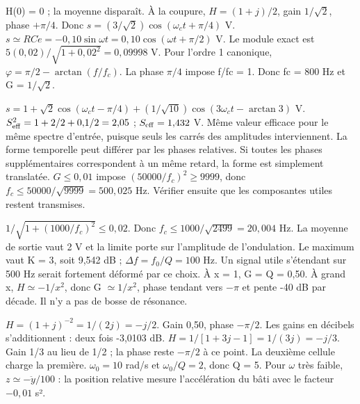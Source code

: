 H(0) = 0 ; la moyenne disparaît. À la coupure, $H=(1+j)/2$, gain $1/\sqrt2$, phase $+\pi/4$. Donc $s=(3/\sqrt2)\cos(\omega_ct+\pi/4)$ V.
$s\simeq RC\dot e=-0{,}10\sin\omega t=0{,}10\cos(\omega t+\pi/2)$ V. Le module exact est $5(0{,}02)/\sqrt{1+0{,}02^2}=0{,}09998$ V.
Pour l’ordre 1 canonique, $\varphi=\pi/2-\arctan(f/f_c)$. La phase $\pi/4$ impose f/fc = 1. Donc fc = 800 Hz et G = $1/\sqrt2$.


$s=1+\sqrt2\cos(\omega_ct-\pi/4)+(1/\sqrt{10})\cos(3\omega_ct-\arctan3)$ V. $S_{\rm eff}^2=1+2/2+0{,}1/2=2{,}05$ ; $S_{\rm eff}=1{,}432$ V.
Même valeur efficace pour le même spectre d’entrée, puisque seuls les carrés des amplitudes interviennent. La forme temporelle peut différer par les phases relatives. Si toutes les phases supplémentaires correspondent à un même retard, la forme est simplement translatée.
$G\leq0{,}01$ impose $(50000/f_c)^2\geq9999$, donc $f_c\leq50000/\sqrt{9999}=500{,}025$ Hz. Vérifier ensuite que les composantes utiles restent transmises.


$1/\sqrt{1+(1000/f_c)^2}\leq0{,}02$. Donc $f_c\leq1000/\sqrt{2499}=20{,}004$ Hz. La moyenne de sortie vaut 2 V et la limite porte sur l’amplitude de l’ondulation.
Le maximum vaut K = 3, soit 9,542 dB ; $\Delta f=f_0/Q=100$ Hz. Un signal utile s’étendant sur 500 Hz serait fortement déformé par ce choix.
À x = 1, G = Q = 0,50. À grand x, $H\simeq-1/x^2$, donc G $\simeq1/x^2$, phase tendant vers $-\pi$ et pente -40 dB par décade. Il n’y a pas de bosse de résonance.


$H=(1+j)^{-2}=1/(2j)=-j/2$. Gain 0,50, phase $-\pi/2$. Les gains en décibels s’additionnent : deux fois -3,0103 dB.
$H=1/[1+3j-1]=1/(3j)=-j/3$. Gain 1/3 au lieu de 1/2 ; la phase reste $-\pi/2$ à ce point. La deuxième cellule charge la première.
$\omega_0=10$ rad/s et $\omega_0/Q=2$, donc Q = 5. Pour \ensuremath{\omega} très faible, $z\simeq-\ddot y/100$ : la position relative mesure l’accélération du bâti avec le facteur $-0{,}01$ s².


